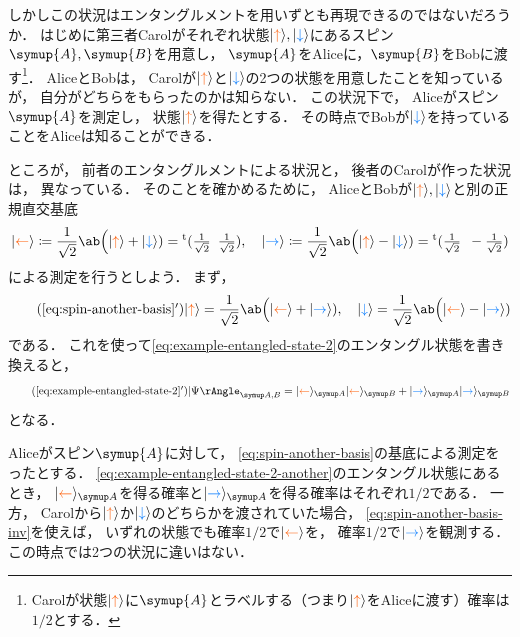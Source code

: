 \documentclass[
]{sotsu}
\newcommand{\bitone}{\mathcolor{fire}{\uparrow}}
\newcommand{\bittwo}{\mathcolor{water}{\downarrow}}
\newcommand{\bitthr}{\mathcolor{fire}{\leftarrow}}
\newcommand{\bitfou}{\mathcolor{water}{\rightarrow}}
\begin{document}
しかしこの状況はエンタングルメントを用いずとも再現できるのではないだろうか．
はじめに第三者Carolがそれぞれ状態$\ket{\bitone}, \ket{\bittwo}$にあるスピン$\symup{A}, \symup{B}$を用意し，
$\symup{A}$をAliceに，$\symup{B}$をBobに渡す\footnote{
    Carolが状態$\ket{\bitone}$に$\symup{A}$とラベルする（つまり$\ket{\bitone}$をAliceに渡す）確率は$1/2$とする．
}．
AliceとBobは，
Carolが$\ket{\bitone}$と$\ket{\bittwo}$の2つの状態を用意したことを知っているが，
自分がどちらをもらったのかは知らない．
この状況下で，
Aliceがスピン$\symup{A}$を測定し，
状態$\ket{\bitone}$を得たとする．
その時点でBobが$\ket{\bittwo}$を持っていることをAliceは知ることができる．

ところが，
前者のエンタングルメントによる状況と，
後者のCarolが作った状況は，
異なっている．
そのことを確かめるために，
AliceとBobが$\ket{\bitone}, \ket{\bittwo}$と別の正規直交基底
\begin{align}
    \label{eq:spin-another-basis}
    \ket{\bitthr} 
    \coloneq \frac{1}{\sqrt{2}} \ab\Big( \ket{\bitone} + \ket{\bittwo} )
    = \cvector{ \tfrac{1}{\sqrt{2}} ; \tfrac{1}{\sqrt{2}} }
    ,
    \quad 
    \ket{\bitfou} 
    \coloneq \frac{1}{\sqrt{2}} \ab\Big( \ket{\bitone} - \ket{\bittwo} )
    = \cvector{ \tfrac{1}{\sqrt{2}} ; -\tfrac{1}{\sqrt{2}} }
\end{align}
による測定を行うとしよう．
まず，
\begin{equation}
    \label{eq:spin-another-basis-inv}
    \tag{\ref*{eq:spin-another-basis}$'$}
    \ket{\bitone} = \frac{1}{\sqrt{2}} \ab\Big( \ket{\bitthr} + \ket{\bitfou} ),
    \quad 
    \ket{\bittwo} = \frac{1}{\sqrt{2}} \ab\Big( \ket{\bitthr} - \ket{\bitfou} )
\end{equation}
である．
これを使って\cref{eq:example-entangled-state-2}のエンタングル状態を書き換えると，
\begin{equation}
    \label{eq:example-entangled-state-2-another}
    \tag{\ref*{eq:example-entangled-state-2}$'$}
    \Ket{\Psi}<A,B> = \ket{\bitthr}<A> \ket{\bitthr}<B> + \ket{\bitfou}<A> \ket{\bitfou}<B>
\end{equation}
となる．

Aliceがスピン$\symup{A}$に対して，
\cref{eq:spin-another-basis}の基底による測定をったとする．
\cref{eq:example-entangled-state-2-another}のエンタングル状態にあるとき，
$\ket{\bitthr}<A>$を得る確率と$\ket{\bitfou}<A>$を得る確率はそれぞれ$1/2$である．
一方，
Carolから$\ket{\bitone}$か$\ket{\bittwo}$のどちらかを渡されていた場合，
\cref{eq:spin-another-basis-inv}を使えば，
いずれの状態でも確率$1/2$で$\ket{\bitthr}$を，
確率$1/2$で$\ket{\bitfou}$を観測する．
この時点では2つの状況に違いはない．
\end{document}
